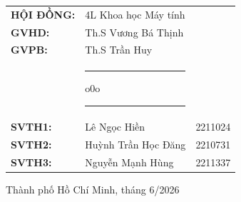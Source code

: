 \documentclass[a4paper]{article}
\begin{document}
\begin{titlepage}
\begin{center}
    \begin{tabular}{lll}
    \Large \bf HỘI ĐỒNG: &\Large 4L Khoa học Máy tính & \\
    \Large \bf GVHD:  &\Large Th.S Vương Bá Thịnh & \\
    \Large \bf GVPB:  &\Large Th.S Trần Huy & 
    \vspace{0.2cm}\\
    &   \rule[0.5ex]{1.5cm}{0.4pt}o0o\rule[0.5ex]{1.5cm}{0.4pt} &\\
    \Large \bf SVTH1:  &\Large Lê Ngọc Hiền &\Large 2211024 \\
    \Large \bf SVTH2:  &\Large Huỳnh Trần Học Đăng &\Large 2210731\\
    \Large \bf SVTH3:  &\Large Nguyễn Mạnh Hùng &\Large 2211337 \\
    \end{tabular}
    \end{center}
    \vfill
    \vspace{0.5cm}
    \begin{center}
    {\large Thành phố Hồ Chí Minh, tháng 6/2026}
\end{center}
\end{titlepage}


\clearpage
\setcounter{page}{1} %
\newpage
\tableofcontents
\listoffigures
\listoftables
\newpage












% 
% 
% 


\end{document}
